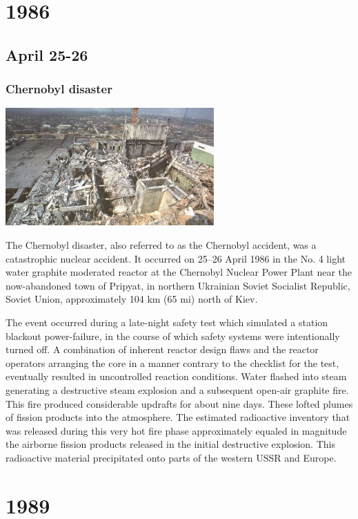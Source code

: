 \documentclass[11pt]{report}
\begin{document}
\chapter{1986}
\section{April 25-26}
\subsection{Chernobyl disaster}
\vspace{2mm}\begin{center}\includegraphics[width=8cm]{./img/chernobyl.jpg}\end{center}
The Chernobyl disaster, also referred to as the Chernobyl accident, was a catastrophic nuclear accident. It occurred on 25–26 April 1986 in the No. 4 light water graphite moderated reactor at the Chernobyl Nuclear Power Plant near the now-abandoned town of Pripyat, in northern Ukrainian Soviet Socialist Republic, Soviet Union, approximately 104 km (65 mi) north of Kiev.

The event occurred during a late-night safety test which simulated a station blackout power-failure, in the course of which safety systems were intentionally turned off. A combination of inherent reactor design flaws and the reactor operators arranging the core in a manner contrary to the checklist for the test, eventually resulted in uncontrolled reaction conditions. Water flashed into steam generating a destructive steam explosion and a subsequent open-air graphite fire. This fire produced considerable updrafts for about nine days. These lofted plumes of fission products into the atmosphere. The estimated radioactive inventory that was released during this very hot fire phase approximately equaled in magnitude the airborne fission products released in the initial destructive explosion. This radioactive material precipitated onto parts of the western USSR and Europe.

\chapter{1989}
\end{document}
